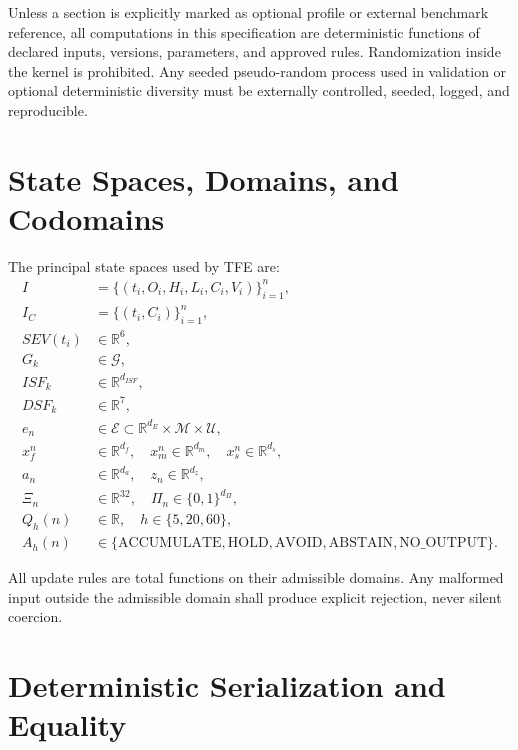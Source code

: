 Unless a section is explicitly marked as optional profile or external benchmark reference, all computations in this specification are deterministic functions of declared inputs, versions, parameters, and approved rules. Randomization inside the kernel is prohibited. Any seeded pseudo-random process used in validation or optional deterministic diversity must be externally controlled, seeded, logged, and reproducible.


\section{State Spaces, Domains, and Codomains}

The principal state spaces used by TFE are:
\begin{align*}
I &= \{(t_i,O_i,H_i,L_i,C_i,V_i)\}_{i=1}^{n},\\
I_C &= \{(t_i,C_i)\}_{i=1}^{n},\\
SEV(t_i) &\in \mathbb{R}^{6},\\
G_k &\in \mathcal{G},\\
ISF_k &\in \mathbb{R}^{d_{ISF}},\\
DSF_k &\in \mathbb{R}^{7},\\
e_n &\in \mathcal{E}\subset \mathbb{R}^{d_E}\times\mathcal{M}\times\mathcal{U},\\
x_f^n &\in \mathbb{R}^{d_f},\quad x_m^n \in \mathbb{R}^{d_m},\quad x_s^n\in\mathbb{R}^{d_s},\\
a_n &\in \mathbb{R}^{d_a},\quad z_n\in\mathbb{R}^{d_z},\\
\Xi_n &\in \mathbb{R}^{32},\quad \Pi_n\in\{0,1\}^{d_{\Pi}},\\
Q_h(n) &\in \mathbb{R},\quad h\in\{5,20,60\},\\
A_h(n) &\in \{\text{ACCUMULATE},\text{HOLD},\text{AVOID},\text{ABSTAIN},\text{NO\_OUTPUT}\}.
\end{align*}

All update rules are total functions on their admissible domains. Any malformed input outside the admissible domain shall produce explicit rejection, never silent coercion.

\section{Deterministic Serialization and Equality}

